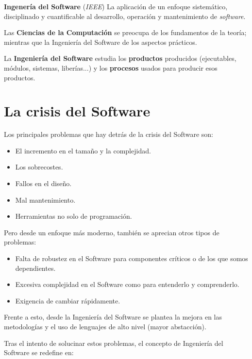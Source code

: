 
\textbf{Ingenería del Software} (\emph{IEEE}) La aplicación de un
enfoque sistemático, disciplinado y cuantificable al desarrollo,
operación y mantenimiento de \emph{software}.\par
Las \textbf{Ciencias de la Computación} se preocupa de los fundamentos
de la teoría; mientras que la Ingeniería del Software de los aspectos
prácticos.\par
La \textbf{Ingeniería del Software} estudia los \textbf{productos}
producidos (ejecutables, módulos, sistemas, liberías...) y los
\textbf{procesos} usados para producir esos productos.

\section{La crisis del Software}
\label{sec:crisis}

Los principales problemas que hay detrás de la crisis del Software
son:
\begin{itemize}[noitemsep]
\item El incremento en el tamaño y la complejidad.
\item Los sobrecostes.
\item Fallos en el diseño.
\item Mal mantenimiento.
\item Herramientas no solo de programación.
\end{itemize}

Pero desde un enfoque más moderno, también se aprecian otros tipos de
problemas:

\begin{itemize}[noitemsep]
\item Falta de robustez en el Software para componentes críticos o de
  los que somos dependientes.
\item Excesiva complejidad en el Software como para entenderlo y
  comprenderlo.
\item Exigencia de cambiar rápidamente.
\end{itemize}

Frente a esto, desde la Ingeniería del Software se plantea la mejora
en las metodologías y el uso de lenguajes de alto nivel (mayor
abstacción).

Tras el intento de solucinar estos problemas, el concepto de Ingeniería
del Software se redefine en:\par

